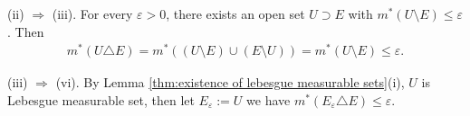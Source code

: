\documentclass{book}
\theoremstyle{defstyle}
\theoremstyle{thmstyle}
\begin{document}
(ii) $\Rightarrow$ (iii). For every $\varepsilon > 0$, there exists an open set $U \supset E$ with $m^*(U \setminus E) \leq \varepsilon$. Then
    \begin{align*}
        m^*(U \triangle E)
        = m^*((U \setminus E) \cup (E \setminus U))
        = m^*(U \setminus E)
        \leq \varepsilon.
    \end{align*}
\begin{comment}
(iii) $\Rightarrow$ (ii). For every $\varepsilon > 0$, let $V \supset U \triangle E$ be open set, then from $m^*(U \triangle E) \leq \varepsilon$, we have
    \begin{align*}
        m^*((V \cup U) \setminus E) = m^*(V \setminus E \cup U \setminus E)
    \end{align*}
\end{comment}

(iii) $\Rightarrow$ (vi). By Lemma \ref{thm:existence of lebesgue measurable sets}(i), $U$ is Lebesgue measurable set, then let $E_\varepsilon := U$ we have $m^*(E_\varepsilon \triangle E) \leq \varepsilon$.

\begin{comment}
(vi) $\Rightarrow$ (iii). For every $\varepsilon > 0$, there exists a Lebesgue measurable set $E_\varepsilon$ such that $m^*(E_\varepsilon \triangle E) \leq \varepsilon$. By Definition \ref{def:lebesgue measurability}, there exists an open set $U \supset E_\varepsilon$ such that $m^*(U \setminus E_\varepsilon) \leq \varepsilon$. Then
    \begin{align*}
        m^*(U \triangle E)
        \leq m^*((E_\varepsilon \triangle E) \cup (U \triangle E_\varepsilon)) \leq 2\varepsilon
    \end{align*}
for that $U \triangle E \subset (E_\varepsilon \triangle E) \cup (U \triangle E_\varepsilon)$.
\end{comment}
\end{document}
